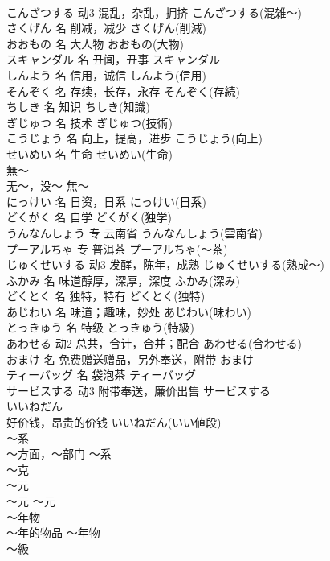 \documentclass[8pt]{extreport}
\begin{document}
\begin{CJK}{UTF8}{min}
\\	こんざつする	动3	混乱，杂乱，拥挤	こんざつする(混雑～)	
\\	さくげん	名	削减，减少	さくげん(削減)	
\\	おおもの	名	大人物	おおもの(大物)	
\\	スキャンダル	名	丑闻，丑事	スキャンダル	
\\	しんよう	名	信用，诚信	しんよう(信用)	
\\	そんぞく	名	存续，长存，永存	そんぞく(存続)	
\\	ちしき	名	知识	ちしき(知識)	
\\	ぎじゅつ	名	技术	ぎじゅつ(技術)	
\\	こうじょう	名	向上，提高，进步	こうじょう(向上)	
\\	せいめい	名	生命	せいめい(生命)	
\\	無～	
\\	无～，没～	無～	
\\	にっけい	名	日资，日系	にっけい(日系)	
\\	どくがく	名	自学	どくがく(独学)	
\\	うんなんしょう	专	云南省	うんなんしょう(雲南省)	
\\	プーアルちゃ	专	普洱茶	プーアルちゃ(～茶)	
\\	じゅくせいする	动3	发酵，陈年，成熟	じゅくせいする(熟成～)	
\\	ふかみ	名	味道醇厚，深厚，深度	ふかみ(深み)	
\\	どくとく	名	独特，特有	どくとく(独特)	
\\	あじわい	名	味道；趣味，妙处	あじわい(味わい)	
\\	とっきゅう	名	特级	とっきゅう(特級)	
\\	あわせる	动2	总共，合计，合并；配合	あわせる(合わせる)	
\\	おまけ	名	免费赠送赠品，另外奉送，附带	おまけ	
\\	ティーバッグ	名	袋泡茶	ティーバッグ	
\\	サービスする	动3	附带奉送，廉价出售	サービスする	
\\	いいねだん	
\\	好价钱，昂贵的价钱	いいねだん(いい値段)	
\\	～系	
\\	～方面，～部门	～系	
\\	～克	
\\	～元	
\\	～元	～元	
\\	～年物	
\\	～年的物品	～年物	
\\	～級	

\end{CJK}
\end{document}
